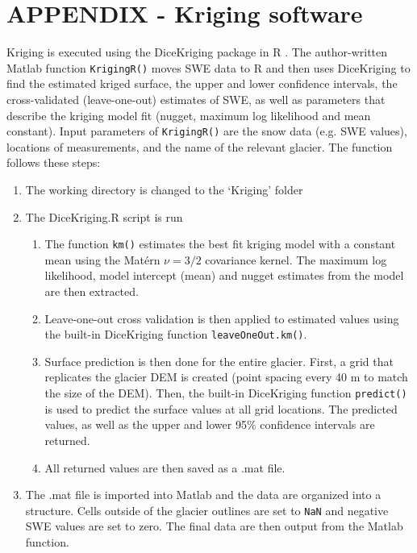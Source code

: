 \documentclass[12pt]{article}
\begin{document}
\section{APPENDIX - Kriging software}
\label{app:KrigingMethods}
Kriging is executed using the DiceKriging package in R \citep{Roustant2012}. The author-written Matlab function \texttt{KrigingR()} moves SWE data to R and then uses DiceKriging to find the estimated kriged surface, the upper and lower confidence intervals, the cross-validated (leave-one-out) estimates of SWE, as well as parameters that describe the kriging model fit (nugget, maximum log likelihood and mean constant). Input parameters of  \texttt{KrigingR()} are the snow data (e.g. SWE values), locations of measurements, and the name of the relevant glacier. The function follows these steps:
\begin{enumerate}
\item The working directory is changed to the `Kriging' folder
\item The DiceKriging.R script is run
	\begin{enumerate}
	\item The function \texttt{km()} estimates the best fit kriging model with a constant mean using the Mat\'ern $\nu = 3/2$ covariance kernel. The maximum log likelihood, model intercept (mean) and nugget estimates from the model are then extracted. 
	\item Leave-one-out cross validation is then applied to estimated values using the built-in DiceKriging function \texttt{leaveOneOut.km()}.
	\item Surface prediction is then done for the entire glacier. First, a grid that replicates the glacier DEM is created (point spacing every 40 m to match the size of the DEM). Then, the built-in DiceKriging function \texttt{predict()} is used to predict the surface values at all grid locations. The predicted values, as well as the upper and lower 95\% confidence intervals are returned. 
	\item All returned values are then saved as a .mat file.
	\end{enumerate}
\item The .mat file is imported into Matlab and the data are organized into a structure. Cells outside of the glacier outlines are set to \texttt{NaN} and negative SWE values are set to zero. The final data are then output from the Matlab function. 
\end{enumerate}
\end{document}
